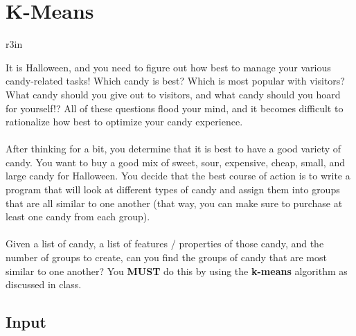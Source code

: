 \documentclass[11pt]{article}
\begin{document}
\section*{K-Means}


\begin{wrapfigure}{r}{3in}
\vspace{-10pt}
\vspace{-30pt}
\end{wrapfigure}

It is Halloween, and you need to figure out how best to manage your various candy-related tasks! Which candy is best? Which is most popular with visitors? What candy should you give out to visitors, and what candy should you hoard for yourself!? All of these questions flood your mind, and it becomes difficult to rationalize how best to optimize your candy experience. 
\\
\\
After thinking for a bit, you determine that it is best to have a good variety of candy. You want to buy a good mix of sweet, sour, expensive, cheap, small, and large candy for Halloween. You decide that the best course of action is to write a program that will look at different types of candy and assign them into groups that are all similar to one another (that way, you can make sure to purchase at least one candy from each group).\\
\\
Given a list of candy, a list of features / properties of those candy, and the number of groups to create, can you find the groups of candy that are most similar to one another? You \textbf{MUST} do this by using the \textbf{k-means} algorithm as discussed in class.


\subsection*{Input}
\end{document}
